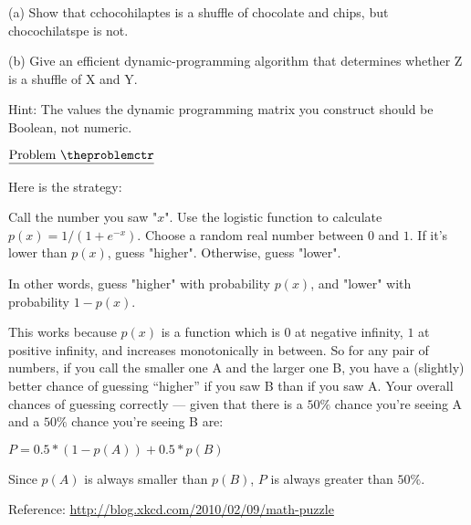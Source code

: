 \documentclass[11pt]{article}
\def\pp{\par\noindent}
\begin{document}
\noindent(a) Show that cchocohilaptes is a shuffle of chocolate and chips,
but chocochilatspe is not.

\noindent(b) Give an efficient dynamic-programming algorithm that
determines
whether Z is a shuffle of X and Y.

\noindent Hint: The values the dynamic programming matrix you construct
should
be Boolean, not numeric.

\vfill
\newpage
\addtocounter{problemctr}{1}
\bigskip
\noindent
$\underline{\rm Problem\ \theproblemctr}$\pp
\noindent
Here is the strategy:

Call the number you saw "$x$". Use the logistic function to calculate $p(x)=1/(1+e^{-x})$. Choose a random real number between $0$ and $1$. If it's lower than $p(x)$, guess "higher". Otherwise, guess "lower".

In other words, guess "higher" with probability $p(x)$, and "lower" with probability $1-p(x)$.

This works because $p(x)$ is a function which is $0$ at negative infinity, $1$ at positive infinity, and increases monotonically in between. So for any pair of numbers, if you call the smaller one A and the larger one B, you have a (slightly) better chance of guessing “higher” if you saw B than if you saw A. Your overall chances of guessing correctly — given that there is a $50\%$ chance you’re seeing A and a $50\%$ chance you’re seeing B are:

$P = 0.5 * (1-p(A)) + 0.5 * p(B)$

Since $p(A)$ is always smaller than $p(B)$, $P$ is always greater than $50\%$. 

\bigskip
Reference: \url{http://blog.xkcd.com/2010/02/09/math-puzzle}
\end{document}
